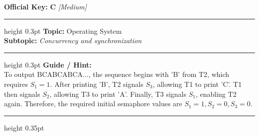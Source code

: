 \documentclass[a4paper,10pt]{article}
\begin{document}
\begin{tcolorbox}
\textbf{Official Key:} \textbf{\large C} \hfill \textit{\small [Medium]}
\vspace{2pt}\hrule height 0.3pt\vspace{3pt}
\textbf{Topic:} Operating System \\
\textbf{Subtopic:} \textit{Concurrency and synchronization}
\vspace{2pt}\hrule height 0.3pt\vspace{3pt}
\textbf{Guide / Hint:} \\
{\small To output BCABCABCA..., the sequence begins with 'B' from T2, which requires $S_1 = 1$. After printing 'B', T2 signals $S_3$, allowing T1 to print 'C'. T1 then signals $S_2$, allowing T3 to print 'A'. Finally, T3 signals $S_1$, enabling T2 again. Therefore, the required initial semaphore values are $S_1 = 1, S_2 = 0, S_3 = 0$.}

\end{tcolorbox}
\vspace{6pt}\hrule height 0.35pt\vspace{6pt}
\noindent
\end{document}
